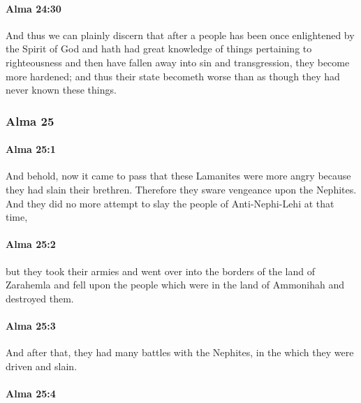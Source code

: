 		\paragraph{Alma 24:30} %
			\label{ALMA-24-30}

			And thus we can plainly discern that
			after a people has been once enlightened by the Spirit of God
			and hath had great knowledge of things pertaining to righteousness
			and then have fallen away into sin and transgression,
			they become more hardened;
			and thus their state becometh worse
			than as though they had never known these things.

	\subsubsection{Alma 25} %
		\label{ALMA-25}
		
		\paragraph{Alma 25:1} %
			\label{ALMA-25-1}

			And behold, now it came to pass that
			these Lamanites were more angry because they had slain their brethren.
			Therefore they sware vengeance upon the Nephites.
			And they did no more attempt to slay the people of Anti-Nephi-Lehi at that time,

		\paragraph{Alma 25:2} %
			\label{ALMA-25-2}

			but they took their armies and went over into the borders of the land of Zarahemla
			and fell upon the people which were in the land of Ammonihah
			and destroyed them.

		\paragraph{Alma 25:3} %
			\label{ALMA-25-3}

			And after that, they had many battles with the Nephites,
			in the which they were driven and slain.

		\paragraph{Alma 25:4} %
			\label{ALMA-25-4}

